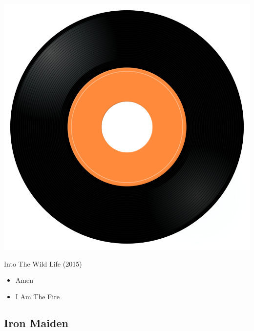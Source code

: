 \begin{minipage}[t]{0.25\textwidth}\vspace{0pt}
\captionsetup{type=figure}
\includegraphics[width=\textwidth]{Images/cover.png}
\caption*{Into The Wild Life (2015)}
\end{minipage}
\begin{minipage}[t]{0.25\textwidth}\vspace{0pt}
\begin{itemize}[nosep,leftmargin=1em,labelwidth=*,align=left]
	\setlength{\itemsep}{0pt}
	\item Amen
	\item I Am The Fire
\end{itemize}
\end{minipage}

\subsection{Iron Maiden}

